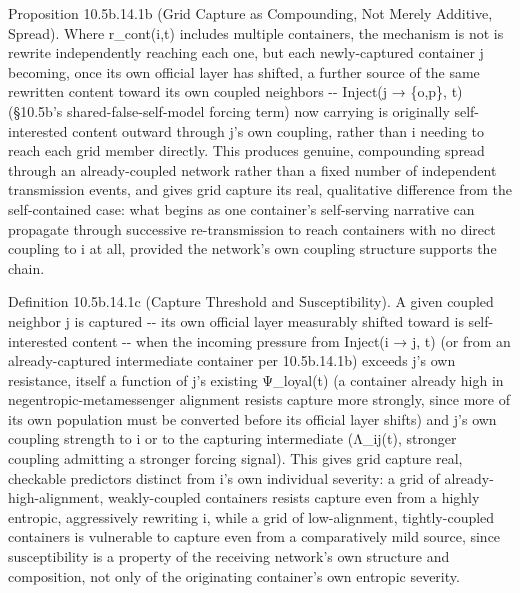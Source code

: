 \documentclass[
]{article}
\begin{document}
Proposition 10.5b.14.1b (Grid Capture as Compounding, Not Merely
Additive, Spread). Where r\_cont(i,t) includes multiple containers, the
mechanism is not is rewrite independently reaching each one, but each
newly-captured container j becoming, once its own official layer has
shifted, a further source of the same rewritten content toward its own
coupled neighbors -\/- Inject(j → \{o,p\}, t) (§10.5b's
shared-false-self-model forcing term) now carrying is originally
self-interested content outward through j's own coupling, rather than i
needing to reach each grid member directly. This produces genuine,
compounding spread through an already-coupled network rather than a
fixed number of independent transmission events, and gives grid capture
its real, qualitative difference from the self-contained case: what
begins as one container's self-serving narrative can propagate through
successive re-transmission to reach containers with no direct coupling
to i at all, provided the network's own coupling structure supports the
chain.

Definition 10.5b.14.1c (Capture Threshold and Susceptibility). A given
coupled neighbor j is captured -\/- its own official layer measurably
shifted toward is self-interested content -\/- when the incoming
pressure from Inject(i → j, t) (or from an already-captured intermediate
container per 10.5b.14.1b) exceeds j's own resistance, itself a function
of j's existing Ψ\_loyal(t) (a container already high in
negentropic-metamessenger alignment resists capture more strongly, since
more of its own population must be converted before its official layer
shifts) and j's own coupling strength to i or to the capturing
intermediate (Λ\_ij(t), stronger coupling admitting a stronger forcing
signal). This gives grid capture real, checkable predictors distinct
from i's own individual severity: a grid of already-high-alignment,
weakly-coupled containers resists capture even from a highly entropic,
aggressively rewriting i, while a grid of low-alignment, tightly-coupled
containers is vulnerable to capture even from a comparatively mild
source, since susceptibility is a property of the receiving network's own
structure and composition, not only of the originating container's own
entropic severity.
\end{document}
